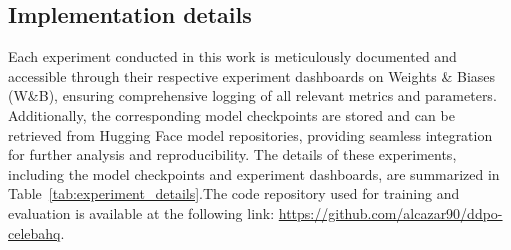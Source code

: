 \begin{appendixs}

    \section{Implementation details}\label{appendix:implementation}

    Each experiment conducted in this work is meticulously documented and accessible through their respective experiment dashboards on Weights \& Biases (W\&B), ensuring comprehensive logging of all relevant metrics and parameters. Additionally, the corresponding model checkpoints are stored and can be retrieved from Hugging Face model repositories, providing  seamless integration for further analysis and reproducibility. The details of these experiments, including the model checkpoints and experiment dashboards, are summarized in Table~\ref{tab:experiment_details}.The code
    repository used for training and evaluation is available at the following link: \href{https://github.com/alcazar90/ddpo-celebahq}{https://github.com/alcazar90/ddpo-celebahq}.


\end{appendixs}
